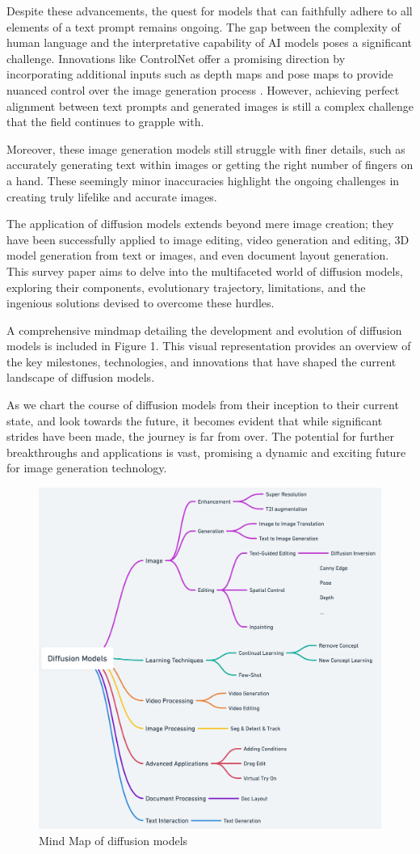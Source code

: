 Despite these advancements, the quest for models that can faithfully adhere to all elements of a text prompt remains ongoing. The gap between the complexity of human language and the interpretative capability of AI models poses a significant challenge. Innovations like ControlNet offer a promising direction by incorporating additional inputs such as depth maps and pose maps to provide nuanced control over the image generation process \cite{ControlNet}. However, achieving perfect alignment between text prompts and generated images is still a complex challenge that the field continues to grapple with.

Moreover, these image generation models still struggle with finer details, such as accurately generating text within images or getting the right number of fingers on a hand. These seemingly minor inaccuracies highlight the ongoing challenges in creating truly lifelike and accurate images.

The application of diffusion models extends beyond mere image creation; they have been successfully applied to image editing, video generation and editing, 3D model generation from text or images, and even document layout generation. This survey paper aims to delve into the multifaceted world of diffusion models, exploring their components, evolutionary trajectory, limitations, and the ingenious solutions devised to overcome these hurdles.

A comprehensive mindmap detailing the development and evolution of diffusion models is included in Figure 1. This visual representation provides an overview of the key milestones, technologies, and innovations that have shaped the current landscape of diffusion models.

As we chart the course of diffusion models from their inception to their current state, and look towards the future, it becomes evident that while significant strides have been made, the journey is far from over. The potential for further breakthroughs and applications is vast, promising a dynamic and exciting future for image generation technology.


\begin{figure}[]
    \centering
    \includegraphics[width=\textwidth]{images/mind-map.png}
    \caption{Mind Map of diffusion models}
    \end{figure}
